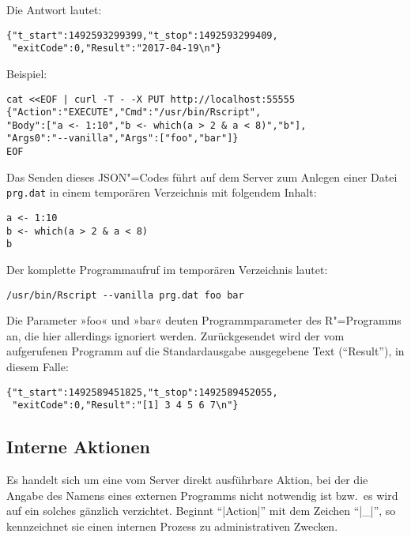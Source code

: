 \documentclass[titlepage=false,toc=nobibliography]{vl-report}
\begin{document}
Die Antwort lautet:
\begin{lstlisting}[language={}]
{"t_start":1492593299399,"t_stop":1492593299409,
 "exitCode":0,"Result":"2017-04-19\n"}
\end{lstlisting}
Beispiel:
\begin{lstlisting}[language={}]
cat <<EOF | curl -T - -X PUT http://localhost:55555
{"Action":"EXECUTE","Cmd":"/usr/bin/Rscript",
"Body":["a <- 1:10","b <- which(a > 2 & a < 8)","b"],
"Args0":"--vanilla","Args":["foo","bar"]}
EOF
\end{lstlisting}
Das Senden dieses JSON"=Codes führt auf dem Server zum Anlegen einer Datei 
\verb|prg.dat| in einem temporären Verzeichnis mit folgendem Inhalt:
\begin{lstlisting}[language={},name=Beispiel:]
a <- 1:10
b <- which(a > 2 & a < 8)
b
\end{lstlisting}
Der komplette Programmaufruf im temporären Verzeichnis lautet:
\begin{lstlisting}[language={}]
/usr/bin/Rscript --vanilla prg.dat foo bar
\end{lstlisting} 
Die Parameter »foo« und »bar« deuten Programmparameter des R"=Programms an, die 
hier allerdings ignoriert werden. Zurückgesendet wird der vom aufgerufenen 
Programm auf die Standardausgabe ausgegebene Text ("`Result"'), in diesem 
Falle:
\begin{lstlisting}[language={},name=Rückgabe:]
{"t_start":1492589451825,"t_stop":1492589452055,
 "exitCode":0,"Result":"[1] 3 4 5 6 7\n"}
\end{lstlisting}

\subsection{Interne Aktionen}

  Es handelt sich um eine vom Server direkt ausführbare Aktion, bei der die
  Angabe des Namens eines externen Programms nicht notwendig ist bzw.\ es
  wird auf ein solches gänzlich verzichtet. Beginnt "`|Action|"' mit dem
  Zeichen "`|_|"', so kennzeichnet sie einen internen Prozess zu
  administrativen Zwecken.
\end{document}
